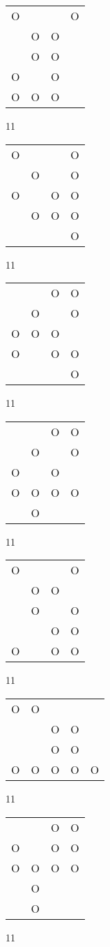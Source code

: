 \begin{tabular}{|m{0.2cm}m{0.2cm}m{0.2cm}m{0.2cm}|}\hline
O& & &O\\
 &O&O& \\
 &O&O& \\
O& &O& \\
O&O&O& \\
\hline\end{tabular}11
\begin{tabular}{|m{0.2cm}m{0.2cm}m{0.2cm}m{0.2cm}|}\hline
O& & &O\\
 &O& &O\\
O& &O&O\\
 &O&O&O\\
 & & &O\\
\hline\end{tabular}11
\begin{tabular}{|m{0.2cm}m{0.2cm}m{0.2cm}m{0.2cm}|}\hline
 & &O&O\\
 &O& &O\\
O&O&O& \\
O& &O&O\\
 & & &O\\
\hline\end{tabular}11
\begin{tabular}{|m{0.2cm}m{0.2cm}m{0.2cm}m{0.2cm}|}\hline
 & &O&O\\
 &O& &O\\
O& &O& \\
O&O&O&O\\
 &O& & \\
\hline\end{tabular}11
\begin{tabular}{|m{0.2cm}m{0.2cm}m{0.2cm}m{0.2cm}|}\hline
O& & &O\\
 &O&O& \\
 &O& &O\\
 & &O&O\\
O& &O&O\\
\hline\end{tabular}11
\begin{tabular}{|m{0.2cm}m{0.2cm}m{0.2cm}m{0.2cm}m{0.2cm}|}\hline
O&O& & & \\
 & &O&O& \\
 & &O&O& \\
O&O&O&O&O\\
\hline\end{tabular}11
\begin{tabular}{|m{0.2cm}m{0.2cm}m{0.2cm}m{0.2cm}|}\hline
 & &O&O\\
O& &O&O\\
O&O&O&O\\
 &O& & \\
 &O& & \\
\hline\end{tabular}11
